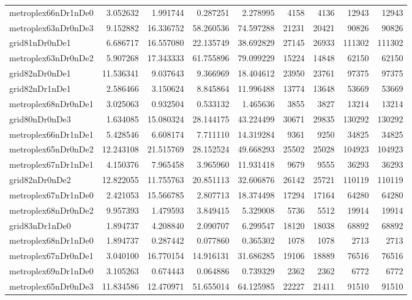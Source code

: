 \begin{longtable}{|l|r|r|r|r|r|r|r|r|}
metroplex66nDr1nDe0 & 3.052632 & 1.991744 & 0.287251 & 2.278995 & 4158 & 4136 & 12943 & 12943 \\
metroplex63nDr0nDe3 & 9.152882 & 16.336752 & 58.260536 & 74.597288 & 21231 & 20421 & 90826 & 90826 \\
grid81nDr0nDe1 & 6.686717 & 16.557080 & 22.135749 & 38.692829 & 27145 & 26933 & 111302 & 111302 \\
metroplex63nDr0nDe2 & 5.907268 & 17.343333 & 61.755896 & 79.099229 & 15224 & 14848 & 62150 & 62150 \\
grid82nDr0nDe1 & 11.536341 & 9.037643 & 9.366969 & 18.404612 & 23950 & 23761 & 97375 & 97375 \\
grid82nDr1nDe1 & 2.586466 & 3.150624 & 8.845864 & 11.996488 & 13774 & 13648 & 53669 & 53669 \\
metroplex68nDr0nDe1 & 3.025063 & 0.932504 & 0.533132 & 1.465636 & 3855 & 3827 & 13214 & 13214 \\
grid80nDr0nDe3 & 1.634085 & 15.080324 & 28.144175 & 43.224499 & 30671 & 29835 & 130292 & 130292 \\
metroplex66nDr1nDe1 & 5.428546 & 6.608174 & 7.711110 & 14.319284 & 9361 & 9250 & 34825 & 34825 \\
metroplex65nDr0nDe2 & 12.243108 & 21.515769 & 28.152524 & 49.668293 & 25502 & 25028 & 104923 & 104923 \\
metroplex67nDr1nDe1 & 4.150376 & 7.965458 & 3.965960 & 11.931418 & 9679 & 9555 & 36293 & 36293 \\
grid82nDr0nDe2 & 12.822055 & 11.755763 & 20.851113 & 32.606876 & 26142 & 25721 & 110119 & 110119 \\
metroplex67nDr1nDe0 & 2.421053 & 15.566785 & 2.807713 & 18.374498 & 17294 & 17164 & 64280 & 64280 \\
metroplex68nDr0nDe2 & 9.957393 & 1.479593 & 3.849415 & 5.329008 & 5736 & 5512 & 19914 & 19914 \\
grid83nDr1nDe0 & 1.894737 & 4.208840 & 2.090707 & 6.299547 & 18120 & 18038 & 68892 & 68892 \\
metroplex68nDr1nDe0 & 1.894737 & 0.287442 & 0.077860 & 0.365302 & 1078 & 1078 & 2713 & 2713 \\
metroplex67nDr0nDe1 & 3.040100 & 16.770154 & 14.916131 & 31.686285 & 19106 & 18889 & 76516 & 76516 \\
metroplex69nDr1nDe0 & 3.105263 & 0.674443 & 0.064886 & 0.739329 & 2362 & 2362 & 6772 & 6772 \\
metroplex65nDr0nDe3 & 11.834586 & 12.470971 & 51.655014 & 64.125985 & 22227 & 21411 & 91510 & 91510 \\

\end{longtable}
